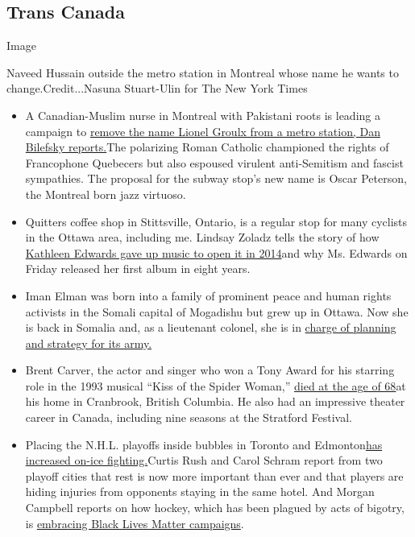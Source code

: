 \hypertarget{trans-canada}{%
\subsection{Trans Canada}\label{trans-canada}}

Image

Naveed Hussain outside the metro station in Montreal whose name he wants
to change.Credit...Nasuna Stuart-Ulin for The New York Times

\begin{itemize}
\item
  A Canadian-Muslim nurse in Montreal with Pakistani roots is leading a
  campaign to
  \href{https://www.nytimes3xbfgragh.onion/2020/08/10/world/canada/oscar-peterson-montreal-little-burgundy.html}{remove
  the name Lionel Groulx from a metro station, Dan Bilefsky reports.}The
  polarizing Roman Catholic championed the rights of Francophone
  Quebecers but also espoused virulent anti-Semitism and fascist
  sympathies. The proposal for the subway stop's new name is Oscar
  Peterson, the Montreal born jazz virtuoso.
\item
  Quitters coffee shop in Stittsville, Ontario, is a regular stop for
  many cyclists in the Ottawa area, including me. Lindsay Zoladz tells
  the story of how
  \href{https://www.nytimes3xbfgragh.onion/2020/08/11/arts/music/kathleen-edwards-total-freedom.html}{Kathleen
  Edwards gave up music to open it in 2014}and why Ms. Edwards on Friday
  released her first album in eight years.
\item
  Iman Elman was born into a family of prominent peace and human rights
  activists in the Somali capital of Mogadishu but grew up in Ottawa.
  Now she is back in Somalia and, as a lieutenant colonel, she is in
  \href{https://www.nytimes3xbfgragh.onion/2020/08/14/world/africa/iman-elman-woman-Somalia-army.html}{charge
  of planning and strategy for its army.}
\item
  Brent Carver, the actor and singer who won a Tony Award for his
  starring role in the 1993 musical ``Kiss of the Spider Woman,''
  \href{https://www.nytimes3xbfgragh.onion/2020/08/07/theater/brent-carver-dead.html}{died
  at the age of 68}at his home in Cranbrook, British Columbia. He also
  had an impressive theater career in Canada, including nine seasons at
  the Stratford Festival.
\item
  Placing the N.H.L. playoffs inside bubbles in Toronto and
  Edmonton\href{https://www.nytimes3xbfgragh.onion/2020/08/13/sports/hockey/nhl-qualifying-round-playoffs.html}{has
  increased on-ice fighting.}Curtis Rush and Carol Schram report from
  two playoff cities that rest is now more important than ever and that
  players are hiding injuries from opponents staying in the same hotel.
  And Morgan Campbell reports on how hockey, which has been plagued by
  acts of bigotry, is
  \href{https://www.nytimes3xbfgragh.onion/2020/08/10/sports/hockey/nhl-racism-protests-george-floyd.html}{embracing
  Black Lives Matter campaigns}.
\end{itemize}


